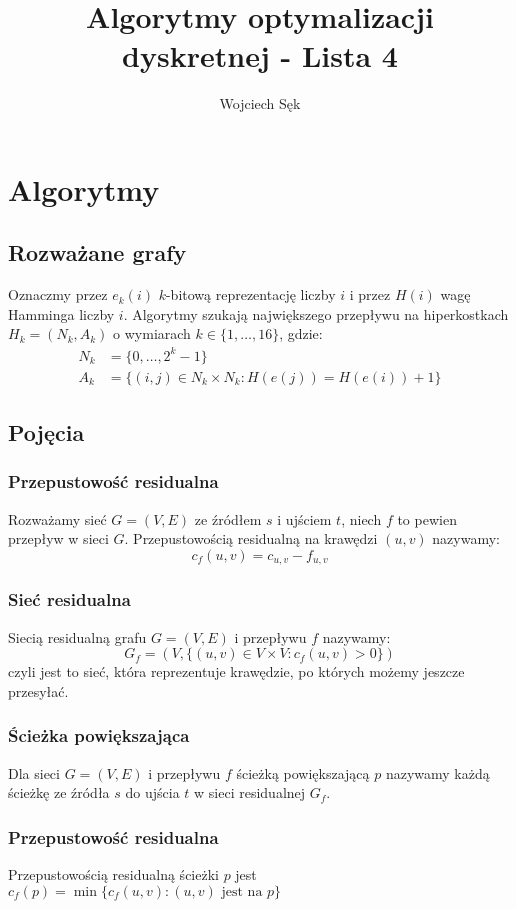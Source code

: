 \documentclass{article}
\title{Algorytmy optymalizacji dyskretnej - Lista 4}
\author{Wojciech Sęk}
\begin{document}
\maketitle
\section{Algorytmy}
\subsection{Rozważane grafy}
Oznaczmy przez $e_k(i)$ $k$-bitową reprezentację liczby $i$ i przez $H(i)$ wagę Hamminga liczby $i$. Algorytmy szukają największego przepływu na hiperkostkach $H_k=(N_k, A_k)$ o wymiarach $k\in\{1,\ldots,16\}$, gdzie:
\begin{align*}
N_k&=\{0,\ldots,2^{k}-1\}\\
A_k&=\{(i,j)\in N_k\times N_k: H(e(j))=H(e(i))+1\}
\end{align*}

\subsection{Pojęcia}
\subsubsection{Przepustowość residualna}
Rozważamy sieć $G=(V,E)$ ze źródłem $s$ i ujściem $t$, niech $f$ to pewien przepływ w sieci $G$. Przepustowością residualną na krawędzi $(u,v)$ nazywamy:
$$c_f(u,v)=c_{u,v}-f_{u,v}$$
\subsubsection{Sieć residualna}
Siecią residualną grafu $G=(V,E)$ i przepływu $f$ nazywamy:
$$G_f=(V, \{(u,v)\in V\times V: c_f(u,v)>0\})$$
czyli jest to sieć, która reprezentuje krawędzie, po których możemy jeszcze przesyłać.
\subsubsection{Ścieżka powiększająca}
Dla sieci $G=(V,E)$ i przepływu $f$ ścieżką powiększającą $p$ nazywamy każdą ścieżkę ze źródła $s$ do ujścia $t$ w sieci residualnej $G_f$.

\subsubsection{Przepustowość residualna}
Przepustowością residualną ścieżki $p$ jest
$c_f(p)=\min\{c_f(u,v):(u,v) \text{ jest na } p \}$
\end{document}

